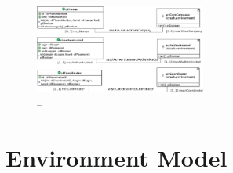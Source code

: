 \begin{figure}[h]
	\centering
	\captionsetup{justification=centering}
	\includegraphics[width=0.5\textwidth]{./images/analysis/concept-model/global/PrimaryTypes-Classes/01/cm-pt-ct-gv-01.eps}
	\caption{--}
\end{figure} 


   

\section{Environment Model}


